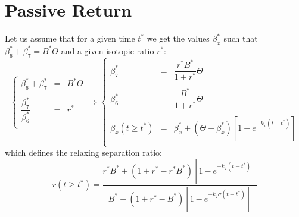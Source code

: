 \documentclass[aps,onecolumn,11pt]{revtex4}
\newcommand{\start}{\ast}
\begin{document}
%

\section{Passive Return}
Let us assume that for a given time $t^\start$ we get the values $\beta_x^\start$ such that $\beta_6^\start+\beta_7^\start=B^\start\Theta$ and a given isotopic ratio $r^\start$:
\begin{equation}
\label{eq:start}
\left\lbrace
\begin{array}{rcl}
\beta_6^\start+\beta_7^\start & = & B^\start\Theta \\
\\
\dfrac{\beta_7^\start}{\beta_6^\start} & = & r^\start\\
\end{array}
\right.
\Rightarrow
\left\lbrace
\begin{array}{rcl}
\beta_7^\start & = & \dfrac{r^\start B^\start}{1+r^\start}\Theta\\
\\
\beta_6^\start & = & \dfrac{B^\start}{1+r^\start}\Theta\\
\\
\beta_x(t\geq t^\start) & = & \beta_x^\start + \left(\Theta-\beta_x^\start\right)\left[1-e^{-k_x(t-t^\start)}\right]\\
\end{array}
\right.
\end{equation}
which defines the relaxing separation ratio:
\begin{equation}
	r(t\geq t^\start) = \dfrac
	{
		r^\start B^\start + ( 1+r^\start - r^\start B^\start) \left[1-e^{-k_7(t-t^\start)}\right]
	}
	{
		 B^\start + ( 1+r^\start -  B^\start) \left[1-e^{-k_7\sigma(t-t^\start)}\right]
	}
\end{equation}
\end{document}
